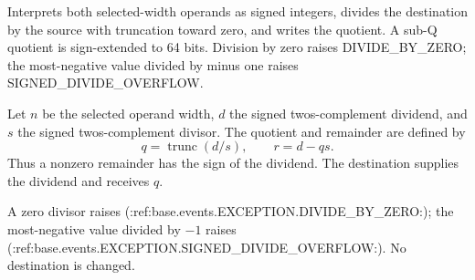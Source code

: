 Interprets both selected-width operands as signed integers, divides the destination by the source with truncation toward zero, and writes the quotient. A sub-Q quotient is sign-extended to 64 bits. Division by zero raises DIVIDE\_BY\_ZERO; the most-negative value divided by minus one raises SIGNED\_DIVIDE\_OVERFLOW.


Let \(n\) be the selected operand width, \(d\) the signed two\textquotesingle{}s-complement dividend, and \(s\) the signed two\textquotesingle{}s-complement divisor. The quotient and remainder are defined by
\[
  q = \operatorname{trunc}(d/s),
  \qquad r = d - qs .
\]
Thus a nonzero remainder has the sign of the dividend. The destination supplies the dividend and receives \(q\).

A zero divisor raises (:ref:base.events.EXCEPTION.DIVIDE_BY_ZERO:); the most-negative value divided by \(-1\) raises (:ref:base.events.EXCEPTION.SIGNED_DIVIDE_OVERFLOW:). No destination is changed.
